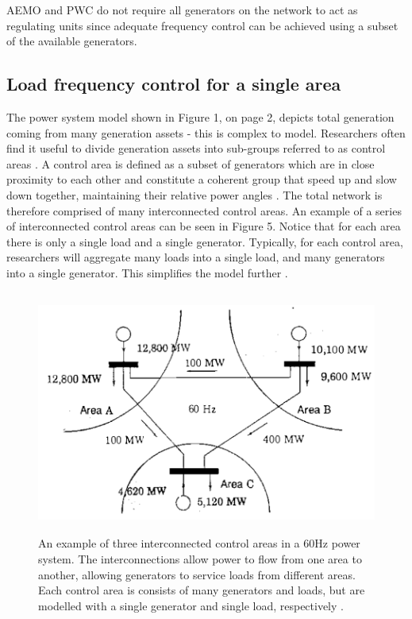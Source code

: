 \documentclass[12pt, a4paper]{article}
\begin{document}
AEMO and PWC do not require all generators on the network to act as regulating units since adequate frequency control can be achieved using a subset of the available generators.

\subsection{Load frequency control for a single area}
The power system model shown in Figure 1, on page 2, depicts total generation coming from many generation assets - this is complex to model. Researchers often find it useful to divide generation assets into sub-groups referred to as control areas \cite{Kothari2011}. A control area is defined as a subset of generators which are in close proximity to each other and constitute a coherent group that speed up and slow down together, maintaining their relative power angles \cite{Kothari2011}. The total network is therefore comprised of many interconnected control areas. An example of a series of interconnected control areas can be seen in Figure 5. Notice that for each area there is only a single load and a single generator. Typically, for each control area, researchers will aggregate many loads into a single load, and many generators into a single generator. This simplifies the model further \cite{Grainger1994}.
\begin{figure}[h]
	\centering
	\includegraphics[height=8cm]{multiple_area_system}
	\caption{An example of three interconnected control areas in a 60$\si{\hertz}$ power system. The interconnections allow power to flow from one area to another, allowing generators to service loads from different areas. Each control area is consists of many generators and loads, but are modelled with a single generator and single load, respectively \cite{Grainger1994}.}
\end{figure}
\end{document}
